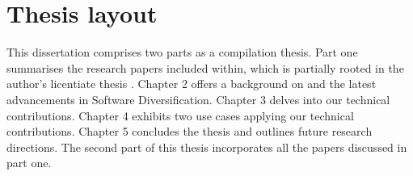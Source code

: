 
\section*{Thesis layout}
This dissertation comprises two parts as a compilation thesis. 
Part one summarises the research papers included within, which is partially rooted in the author's licentiate thesis \cite{Lic}. 
Chapter 2 offers a background on \Wasm and the latest advancements in Software Diversification. 
Chapter 3 delves into our technical contributions. 
Chapter 4 exhibits two use cases applying our technical contributions. 
Chapter 5 concludes the thesis and outlines future research directions. 
The second part of this thesis incorporates all the papers discussed in part one.

